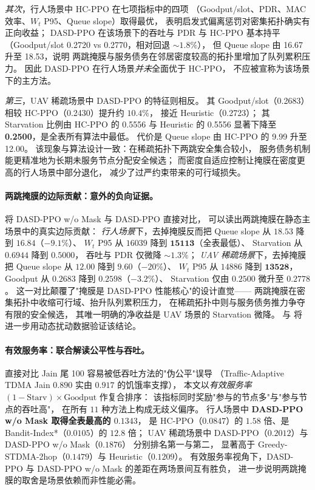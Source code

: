 \emph{其次}，行人场景中 HC-PPO 在七项指标中的四项
（Goodput/slot、PDR、MAC 效率、\(W_t\) P95、Queue slope）取得最优，
表明启发式偏离惩罚对密集拓扑确实有正向收益；
DASD-PPO 在该场景下的吞吐与 PDR 与 HC-PPO 基本持平
（Goodput/slot 0.2720 vs 0.2770，相对回退 \(\sim 1.8\%\)），
但 Queue slope 由 16.67 升至 18.53，说明
两跳掩膜与服务债务在邻居密度较高的拓扑里增加了队列累积压力。
因此 DASD-PPO 在行人场景\emph{并未}全面优于 HC-PPO，
不应被宣称为该场景下的主方法。

\emph{第三}，UAV 稀疏场景中 DASD-PPO 的特征则相反。
其 Goodput/slot（0.2683）相较 HC-PPO（0.2430）提升约 \(10.4\%\)，
接近 Heuristic（0.2723）；
其 Starvation 比例由 HC-PPO 的 0.5556 与 Heuristic 的 0.5556
显著下降至 \textbf{0.2500}，是全表所有算法中最低。
代价是 Queue slope 由 HC-PPO 的 9.99 升至 12.00。
该现象与算法设计一致：在稀疏拓扑下两跳安全集合较小，
服务债务机制能更精准地为长期未服务节点分配安全候选；
而密度自适应控制让掩膜在密度更高的行人场景中部分退化，
减少了过严约束带来的可行域损失。

\paragraph{两跳掩膜的边际贡献：意外的负向证据。}
将 DASD-PPO w/o Mask 与 DASD-PPO 直接对比，
可以读出两跳掩膜在静态主场景中的真实边际贡献：
\emph{行人场景}下，去掉掩膜反而把 Queue slope 从 \(18.53\) 降到 \(16.84\)（\(-9.1\%\)）、
\(W_t\) P95 从 \(16039\) 降到 \(\mathbf{15113}\)（全表最低）、
Starvation 从 \(0.6944\) 降到 \(\mathbf{0.5000}\)，
吞吐与 PDR 仅微降 \(\sim 1.3\%\)；
\emph{UAV 稀疏场景}下，去掉掩膜把 Queue slope 从 \(12.00\) 降到 \(\mathbf{9.60}\)（\(-20\%\)）、
\(W_t\) P95 从 \(14886\) 降到 \(\mathbf{13528}\)，
Goodput 从 \(0.2683\) 降到 \(0.2598\)（\(-3.2\%\)）、
Starvation 仅由 \(0.2500\) 微升至 \(0.2778\)。
这一对比颠覆了"掩膜是 DASD-PPO 性能核心"的设计直觉——
两跳掩膜在密集拓扑中收缩可行域、抬升队列累积压力，
在稀疏拓扑中则与服务债务推力争夺有限的安全候选，
其唯一明确的净收益是 UAV 场景的 Starvation 微降。
 与  将进一步用动态扰动数据验证该结论。

\paragraph{有效服务率：联合解读公平性与吞吐。}
直接对比 Jain 尾 100 容易被低吞吐方法的"伪公平"误导
（Traffic-Adaptive TDMA Jain \(0.890\) 实由 \(0.917\) 的饥饿率支撑），
本文以\emph{有效服务率} \((1-\mathrm{Starv})\times\mathrm{Goodput}\) 作复合排序：
该指标同时奖励"参与的节点多"与"参与节点的吞吐高"，
在所有 \(11\) 种方法上构成无歧义偏序。
行人场景中 \textbf{DASD-PPO w/o Mask 取得全表最高的 \(0.1343\)}，
是 HC-PPO（\(0.0847\)）的 \(1.58\) 倍、是 Bandit-Index*（\(0.0105\)）的 \(12.8\) 倍；
UAV 稀疏场景中 DASD-PPO（\(\mathbf{0.2012}\)）与 DASD-PPO w/o Mask（\(0.1876\)）
分别排名第一与第二，
显著高于 Greedy-STDMA-2hop（\(0.1479\)）与 Heuristic（\(0.1209\)）。
有效服务率视角下，DASD-PPO 与 DASD-PPO w/o Mask 的差距在两场景间互有胜负，
进一步说明两跳掩膜的取舍是场景依赖而非性能必需。

